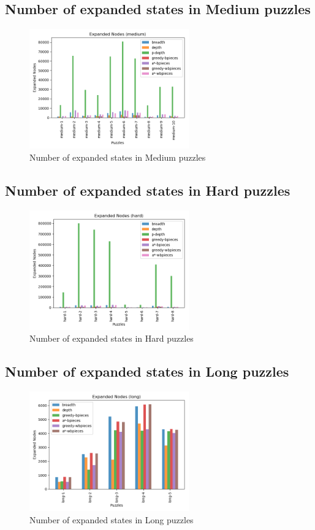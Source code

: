 \documentclass[conference]{IEEEtran}
\begin{document}
\subsection{Number of expanded states in Medium puzzles}
\begin{figure}[H]
    \centerline{\includegraphics[width=260px]{../../graphics/expandedNodes-medium.png}}
    \caption{Number of expanded states in Medium puzzles}
\end{figure}

\subsection{Number of expanded states in Hard puzzles}
\begin{figure}[H]
    \centerline{\includegraphics[width=260px]{../../graphics/expandedNodes-hard.png}}
    \caption{Number of expanded states in Hard puzzles}
\end{figure}

\subsection{Number of expanded states in Long puzzles}
\begin{figure}[H]
    \centerline{\includegraphics[width=260px]{../../graphics/expandedNodes-long.png}}
    \caption{Number of expanded states in Long puzzles}
\end{figure}
\end{document}
